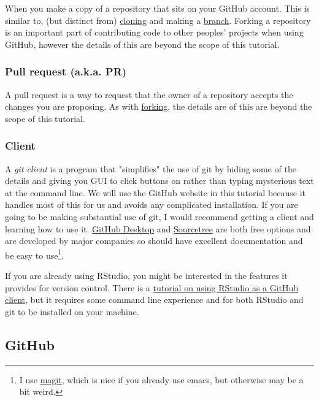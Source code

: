 \documentclass[11pt,onecolumn]{scrartcl}
\begin{document}
When you make a copy of a repository that sits on your GitHub account. This is
similar to, (but distinct from) \hyperref[sec:org30bf8fb]{cloning} and making a \hyperref[sec:org6251582]{branch}. Forking a
repository is an important part of contributing code to other peoples' projects
when using GitHub, however the details of this are beyond the scope of this
tutorial.

\subsubsection*{Pull request (a.k.a. PR)}
\label{sec:orgbd8c980}

A pull request is a way to request that the owner of a repository accepts the
changes you are proposing. As with \hyperref[sec:org3148517]{forking}, the details are of this are beyond
the scope of this tutorial.

\subsubsection*{Client}
\label{sec:orgf18f21c}

A \emph{git client} is a program that "simplifies" the use of git by hiding some of
the details and giving you GUI to click buttons on rather than typing mysterious
text at the command line. We will use the GitHub website in this tutorial
because it handles most of this for us and avoids any complicated installation.
If you are going to be making substantial use of git, I would recommend getting
a client and learning how to use it. \href{https://desktop.github.com/}{GitHub Desktop} and \href{https://www.sourcetreeapp.com/}{Sourcetree} are both free
options and are developed by major companies so should have excellent
documentation and be easy to use\footnote{I use \href{https://magit.vc/}{magit}, which is nice if you already use emacs, but otherwise may be a bit weird.}.

If you are already using RStudio, you might be interested in the features it
provides for version control. There is a \href{https://resources.github.com/github-and-rstudio/}{tutorial on using RStudio as a GitHub
client}, but it requires some command line experience and for both RStudio and
git to be installed on your machine.

\subsection{GitHub}
\label{sec:org849e648}
\end{document}
